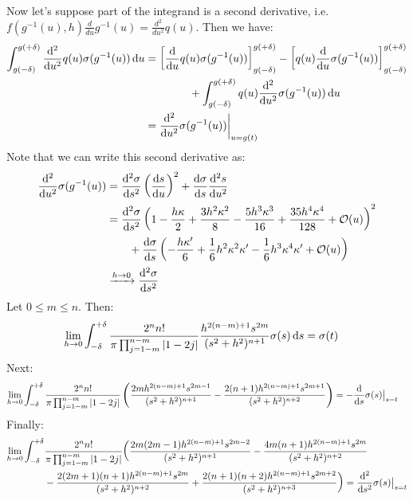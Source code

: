 \documentclass[preprint,12pt,3p]{elsarticle}
\newcommand{\dd}{ {\rm d} }
\begin{document}
Now let's suppose part of the integrand is a second derivative, i.e. $f(g^{-1}(u),h) \frac{d}{du} g^{-1}(u) = \frac{d^2}{du^2} q(u)$. Then we have:
\begin{align}
    \int^{g(+\delta)}_{g(-\delta)} \frac{\dd^2}{\dd u^2} q(u) \sigma(g^{-1}(u)) \, \dd u &= \left[ \frac{\dd}{\dd u} q(u) \sigma(g^{-1} (u)) \right]^{g(+\delta)}_{g(-\delta)}  - \left[ q(u) \frac{\dd}{\dd u} \sigma(g^{-1}(u)) \right]^{g(+\delta)}_{g(-\delta)} \nonumber \\
   & \qquad \qquad + \int^{g(+\delta)}_{g(-\delta)} q(u) \frac{\dd^2}{\dd u^2} \sigma( g^{-1}(u) ) \, \dd u \\
   &= \frac{\dd^2}{\dd u^2} \sigma( g^{-1}(u) ) \bigg|_{u=g(t)}
\end{align}
Note that we can write this second derivative as:
\begin{align}
    \frac{\dd^2}{\dd u^2} \sigma( g^{-1}(u) ) &= \frac{\dd^2 \sigma}{\dd s^2} \left( \frac{\dd s}{\dd u} \right)^2 + \frac{\dd \sigma}{\dd s} \frac{\dd^2 s}{\dd u^2} \\
    &= \frac{\dd^2 \sigma}{\dd s^2} \left(  1 - \frac{h\kappa}{2}+ \frac{3 h^2 \kappa^2}{8} - \frac{5 h^3 \kappa^3}{16} + \frac{35 h^4 \kappa^4}{128}  + \mathcal{O}(u) \right)^2 \\
    &\qquad + \frac{\dd \sigma}{\dd s} \left( -\frac{h \kappa'}{6} + \frac{1}{6} h^2 \kappa^2 \kappa' - \frac16  h^3  \kappa^4  \kappa' + \mathcal{O}(u) \right) \\
    &\xrightarrow{h\rightarrow 0} \frac{\dd^2 \sigma}{\dd s^2}
\end{align}
Let $0 \leq m \leq n$. Then:
\begin{align}
    \lim_{h \rightarrow 0}  \int^{+\delta}_{-\delta}  \frac{  2^n n!}{\pi \prod_{j = 1-m}^{n-m}|1-2j | }  \frac{h^{2(n-m)+1} s^{2m}}{(s^2+h^2)^{n+1}} \sigma(s) \, \dd s &= \displaystyle \sigma(t) 
\end{align}
Next:
\begin{align}
    \lim_{h \rightarrow 0}  \int^{+\delta}_{-\delta}  \frac{ 2^n n!}{\pi \prod_{j = 1-m}^{n-m}|1-2j | } \left( \frac{2m h^{2(n-m)+1} s^{2m-1}}{(s^2+h^2)^{n+1}} - \frac{2 (n+1) h^{2(n-m)+1} s^{2m+1}}{(s^2+h^2)^{n+2}}  \right) &= - \frac{\dd}{\dd s} \displaystyle \sigma(s) \big|_{s = t} 
\end{align} 
Finally:
\begin{align}
    \lim_{h \rightarrow 0}  \int^{+\delta}_{-\delta}&   \frac{ 2^n n!}{\pi \prod_{j = 1-m}^{n-m}|1-2j | } \bigg( \frac{2m(2m-1) h^{2(n-m)+1} s^{2m-2}}{(s^2+h^2)^{n+1}}- \frac{4m(n+1) h^{2(n-m)+1} s^{2m}}{(s^2+h^2)^{n+2}} \nonumber \\
    & - \frac{2(2m+1) (n+1) h^{2(n-m)+1} s^{2m}}{(s^2+h^2)^{n+2}} + \frac{2 (n+1)(n+2) h^{2(n-m)+1} s^{2m+2}}{(s^2+h^2)^{n+3}}  \bigg) = \frac{\dd^2}{\dd s^2} \displaystyle \sigma(s) \big|_{s = t} 
\end{align}  
\end{document}
